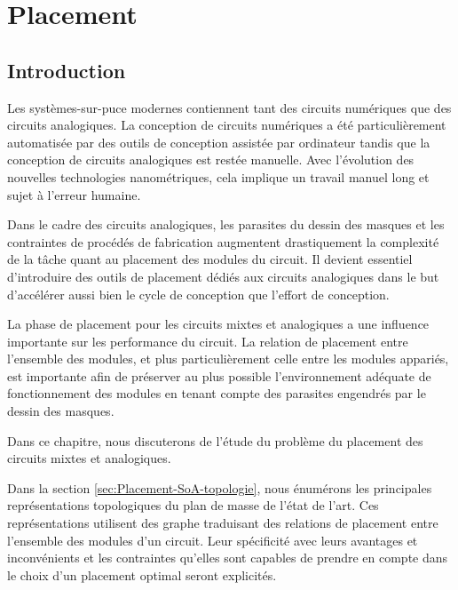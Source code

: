 \chapter{Placement}
\label{chap:Placement}

\section{Introduction}
\label{sec:Placement-Introduction}
Les systèmes-sur-puce modernes contiennent tant des circuits numériques que des circuits analogiques. La conception de circuits numériques a été particulièrement automatisée par des outils de conception assistée par ordinateur tandis que la conception de circuits analogiques est restée manuelle. Avec l'évolution des nouvelles technologies nanométriques, cela implique un travail manuel long et sujet à l'erreur humaine. \newline 

\indent Dans le cadre des circuits analogiques, les parasites du dessin des masques et les contraintes de procédés de fabrication augmentent drastiquement la complexité de la tâche quant au placement des modules du circuit. Il devient essentiel d'introduire des outils de placement dédiés aux circuits analogiques dans le but d'accélérer aussi bien le cycle de conception que l'effort de conception. \newline 

\indent La phase de placement pour les circuits mixtes et analogiques a une influence importante sur les performance du circuit. La relation de placement entre l'ensemble des modules, et plus particulièrement celle entre les modules appariés, est importante afin de préserver au plus possible l'environnement adéquate de fonctionnement des modules en tenant compte des parasites engendrés par le dessin des masques. \newline

\indent Dans ce chapitre, nous discuterons de l'étude du problème du placement des circuits mixtes et analogiques. \newline

\indent Dans la section \ref{sec:Placement-SoA-topologie}, nous énumérons les principales représentations topologiques du plan de masse de l'état de l'art. Ces représentations utilisent des graphe traduisant des relations de placement entre l'ensemble des modules d'un circuit. Leur spécificité avec leurs avantages et inconvénients et les contraintes qu'elles sont capables de prendre en compte dans le choix d'un placement optimal seront explicités. \newline 


